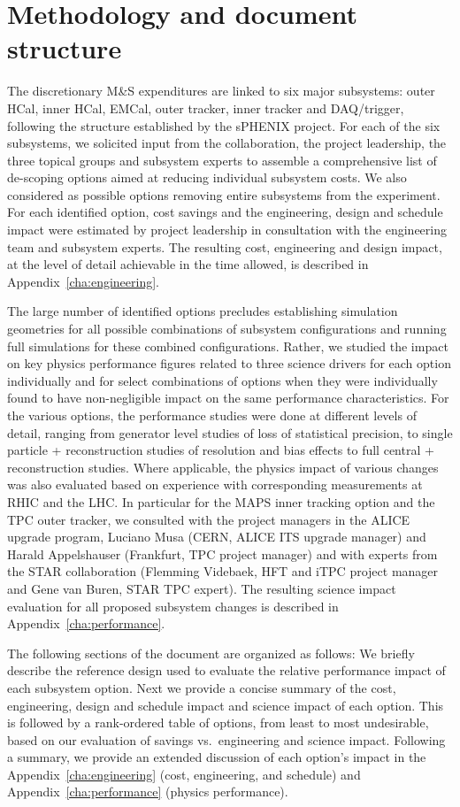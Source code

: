 \section{Methodology and document structure}

The discretionary M\&S expenditures are linked to six major
subsystems: outer HCal, inner HCal, EMCal, outer tracker, inner
tracker and DAQ/trigger, following the structure established by the
sPHENIX project. For each of the six subsystems, we solicited input
from the collaboration, the project leadership, the three topical
groups and subsystem experts to assemble a comprehensive list of
de-scoping options aimed at reducing individual subsystem costs.  We
also considered as possible options removing entire subsystems from
the experiment. For each identified option, cost savings and the
engineering, design and schedule impact were estimated by project
leadership in consultation with the engineering team and subsystem
experts. The resulting cost, engineering and design impact, at the
level of detail achievable in the time allowed, is described in
Appendix~\ref{cha:engineering}.

The large number of identified options precludes establishing
simulation geometries for all possible combinations of subsystem
configurations and running full \geant simulations for these combined
configurations. Rather, we studied the impact on key physics
performance figures related to three science drivers for each option
individually and for select combinations of options when they were
individually found to have non-negligible impact on the same
performance characteristics. For the various options, the performance
studies were done at different levels of detail, ranging from
generator level studies of loss of statistical precision, to single
particle \geant + reconstruction studies of resolution and bias
effects to full central \auau \hijing \geant + reconstruction
studies. Where applicable, the physics impact of various changes was
also evaluated based on experience with corresponding measurements at
RHIC and the LHC. In particular for the MAPS inner tracking option and
the TPC outer tracker, we consulted with the project managers in the
ALICE upgrade program, Luciano Musa (CERN, ALICE ITS upgrade manager)
and Harald Appelshauser (Frankfurt, TPC project manager) and with
experts from the STAR collaboration (Flemming Videbaek, HFT and iTPC
project manager and Gene van Buren, STAR TPC expert). The resulting
science impact evaluation for all proposed subsystem changes is
described in Appendix~\ref{cha:performance}.

The following sections of the document are organized as follows: We
briefly describe the reference design used to evaluate the relative
performance impact of each subsystem option. Next we provide a concise
summary of the cost, engineering, design and schedule impact and
science impact of each option. This is followed by a rank-ordered
table of options, from least to most undesirable, based on our
evaluation of savings vs.\ engineering and science impact. Following a
summary, we provide an extended discussion of each option's impact in
the Appendix~\ref{cha:engineering} (cost, engineering, and schedule)
and Appendix~\ref{cha:performance} (physics performance).


